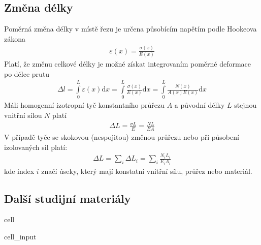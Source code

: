 \documentclass[letterpaper,10pt,english]{jupyterBook}
\begin{document}
{{\subsection{Změna délky}
\label{\detokenize{Prednasky/2_5_Metoda__u0159ezu:zmena-delky}}
\sphinxAtStartPar
Poměrná změna délky v místě řezu je určena působícím napětím podle Hookeova zákona
\begin{equation*}
\begin{split}\varepsilon(x) = \frac{\sigma(x)}{E(x)} \end{split}
\end{equation*}
\sphinxAtStartPar
Platí, že změnu celkové délky je možné získat integrovaním poměrné deformace po délce prutu
\begin{equation*}
\begin{split}\Delta l = \int\limits_0^L \varepsilon(x) \mathrm{d}x = \int\limits_0^L  \frac{\sigma(x)}{E(x)} \mathrm{d}x = \int\limits_0^L  \frac{N(x)}{A(x)E(x)} \mathrm{d}x\end{split}
\end{equation*}
\sphinxAtStartPar
Má\sphinxhyphen{}li homogenní izotropní tyč konstantního průřezu \(A\) a  původní délky \(L\) stejnou vnitřní sílou \(N\) platí
\begin{equation*}
\begin{split}
\Delta L = \frac{\sigma L}{E} = \frac{N L}{E A}
\end{split}
\end{equation*}
\sphinxAtStartPar
V případě tyče se skokovou (nespojitou) změnou průřezu nebo při působení izolovaných sil platí:
\begin{equation*}
\begin{split}
\Delta L = \sum\limits_i \Delta L_i = \sum\limits_i \frac{N_i L_i}{E_i A_i}
\end{split}
\end{equation*}
\sphinxAtStartPar
kde index \(i\) značí úseky, který mají konstatní vnitřní sílu, průřez nebo materiál.


\subsection{Další studijní materiály}
\label{\detokenize{Prednasky/2_5_Metoda__u0159ezu:dalsi-studijni-materialy}}
\begin{sphinxuseclass}{cell}\begin{sphinxVerbatimInput}

\begin{sphinxuseclass}{cell_input}
\begin{sphinxVerbatim}[commandchars=\\\{\}]
 
\end{sphinxVerbatim}


\end{sphinxuseclass}
\end{sphinxVerbatimInput}
\end{sphinxuseclass}}}
\end{document}
